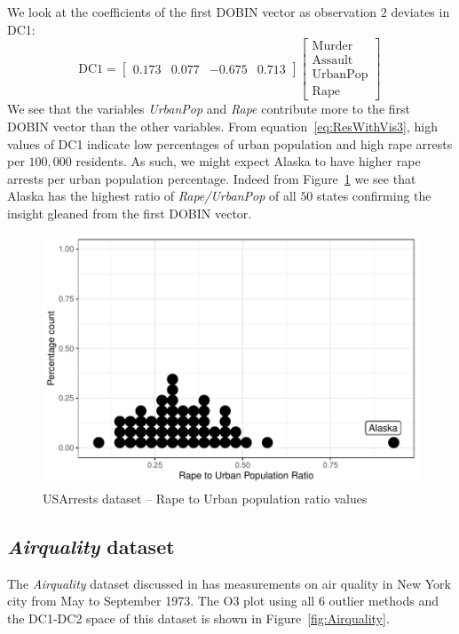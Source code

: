 \documentclass[11pt]{article}
\begin{document}
We look at the coefficients of the first DOBIN vector as observation $2$ deviates in DC1:
\begin{equation}\label{eq:ResWithVis3}
    \text{DC1} = \begin{bmatrix}
    0.173 & 0.077 &  -0.675 & 0.713   
    \end{bmatrix}
    \begin{bmatrix}
    \text{Murder} \\
    \text{Assault} \\
    \text{UrbanPop} \\
    \text{Rape} 
    \end{bmatrix} \, 
\end{equation}
We see that the variables \textit{UrbanPop} and \textit{Rape} contribute more to the first DOBIN vector than the other variables. From equation~\eqref{eq:ResWithVis3},  high values of DC1 indicate  low percentages of urban population and high rape arrests per $100,000$ residents. As such, we might expect Alaska to have higher rape arrests per urban population percentage. Indeed from Figure~\ref{fig:USArrests3} we see that Alaska has the highest ratio of  \textit{Rape/UrbanPop} of all $50$ states confirming the insight gleaned from the first DOBIN vector. 

\begin{figure}[!t]
	\centering
	\includegraphics[scale=0.48]{Ex3_3.pdf}
	\caption{USArrests dataset -- Rape to Urban population ratio values}
	\label{fig:USArrests3}
\end{figure}


\subsection{\textit{Airquality} dataset}\label{sec:ResWithVis4}
The \textit{Airquality} dataset discussed in \cite{john1983graphical} has measurements on air quality in New York city from May to September 1973.  The O3 plot using all $6$ outlier methods and the DC1-DC2 space of this dataset is shown in Figure~\ref{fig:Airquality}.
\end{document}
